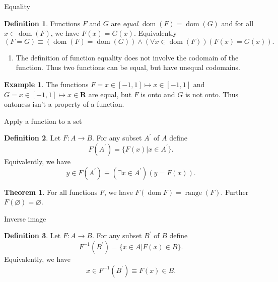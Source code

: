 \documentclass[fleqn]{beamer}
\newcommand{\reals}{\mathbf{R}}
\DeclareMathOperator{\range}{range}
\DeclareMathOperator{\dom}{dom}
\theoremstyle{definition}
\newtheorem{mydef}{Definition}
\newtheorem{myex}{Example}
\newtheorem{myth}{Theorem}
\begin{document}
\begin{frame}{Equality}

\begin{mydef} Functions \(F\) and \(G\) are \emph{equal }  \(\dom(F) = \dom(G)\) and for all \(x \in \dom(F) \), we have \(F(x) = G(x)\).  Equivalently
\[
  (F = G) \equiv (\dom(F) = \dom(G)) \land (\forall  x \in \dom(F))(F(x) = G(x)).
\]
\end{mydef}

\begin{enumerate}
\item The definition of function equality does not involve the codomain of the function. Thus two functions can be equal, but have unequal codomains. 
\end{enumerate}

\begin{myex}  The functions \(F = x \in [-1,1] \mapsto x \in [-1,1]\) and  \(G = x \in [-1,1] \mapsto x \in \reals \)  are equal, but \(F\) is onto and \(G\) is not onto. Thus
ontoness isn't a  property of a function. \end{myex}


\end{frame}




\begin{frame}{Apply a function to a set}

\begin{mydef}  Let \(F : A \to B\).  For any subset \(A^\prime\) of \(A\) define
\[
    F(A^\prime) = \{ F(x) | x \in A^\prime \}.
\]
Equivalently, we have
\[
  y \in F(A^\prime)  \equiv (\exists x \in A^\prime)(y = F(x)).
\]
\end{mydef}  

\begin{myth} For all functions \(F\), we have \(F(\dom{F}) = \range(F) \).   Further \(F(\varnothing) = \varnothing \). \end{myth}


\end{frame}

\begin{frame}{Inverse image}

\begin{mydef}  Let \(F : A \to B\).  For any subset \(B^\prime\) of \(B\) define
\[
    F^{-1} (B^\prime) = \{ x \in A  | F(x) \in B \}.
\]
Equivalently, we have
\[
  x  \in F^{-1} (B^\prime)  \equiv F(x) \in B.
\]
\end{mydef}
\end{frame}  
\end{document}
